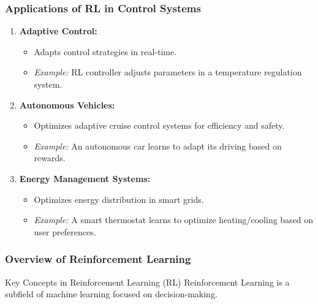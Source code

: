 \documentclass[aspectratio=169]{beamer}
\begin{document}
\begin{frame}[fragile]
    \frametitle{Applications of RL in Control Systems}
    \begin{enumerate}
        \item \textbf{Adaptive Control:}
        \begin{itemize}
            \item Adapts control strategies in real-time.
            \item \textit{Example:} RL controller adjusts parameters in a temperature regulation system.
        \end{itemize}
        
        \item \textbf{Autonomous Vehicles:}
        \begin{itemize}
            \item Optimizes adaptive cruise control systems for efficiency and safety.
            \item \textit{Example:} An autonomous car learns to adapt its driving based on rewards.
        \end{itemize}
        
        \item \textbf{Energy Management Systems:}
        \begin{itemize}
            \item Optimizes energy distribution in smart grids.
            \item \textit{Example:} A smart thermostat learns to optimize heating/cooling based on user preferences.
        \end{itemize}
    \end{enumerate}
\end{frame}

\begin{frame}[fragile]
    \frametitle{Overview of Reinforcement Learning}
    \begin{block}{Key Concepts in Reinforcement Learning (RL)}
        Reinforcement Learning is a subfield of machine learning focused on decision-making.
    \end{block}
\end{frame}
\end{document}
